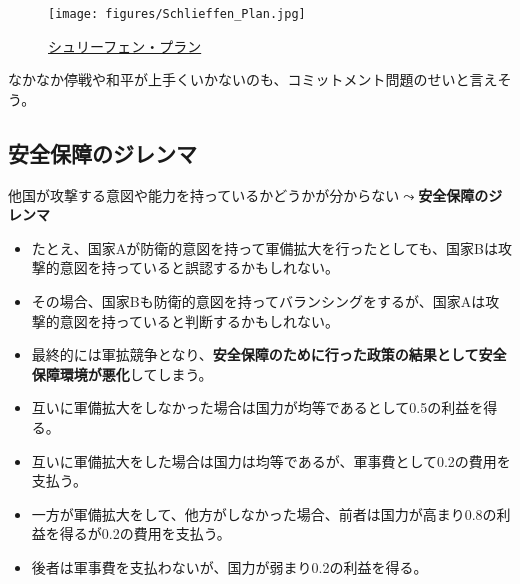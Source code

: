 \documentclass[
  xelatex,
  ja=standard]{bxjsarticle}
\providecommand{\tightlist}{%
  \setlength{\itemsep}{0pt}\setlength{\parskip}{0pt}}\usepackage{longtable,booktabs,array}
\begin{document}
\begin{figure}[htpb]

{\centering \texttt{[image: figures/Schlieffen\_Plan.jpg]}

}

\caption{\href{https://commons.wikimedia.org/wiki/File:Schlieffen_Plan.jpg}{シュリーフェン・プラン}}

\end{figure}

なかなか停戦や和平が上手くいかないのも、コミットメント問題のせいと言えそう。

\hypertarget{ux5b89ux5168ux4fddux969cux306eux30b8ux30ecux30f3ux30de}{%
\subsection{安全保障のジレンマ}\label{ux5b89ux5168ux4fddux969cux306eux30b8ux30ecux30f3ux30de}}

他国が攻撃する意図や能力を持っているかどうかが分からない\(\leadsto\)\textbf{安全保障のジレンマ}\citep{jervis1978}

\begin{itemize}
\tightlist
\item
  たとえ、国家Aが防衛的意図を持って軍備拡大を行ったとしても、国家Bは攻撃的意図を持っていると誤認するかもしれない。
\item
  その場合、国家Bも防衛的意図を持ってバランシングをするが、国家Aは攻撃的意図を持っていると判断するかもしれない。
\item
  最終的には軍拡競争となり、\textbf{安全保障のために行った政策の結果として安全保障環境が悪化}してしまう。
\end{itemize}

\begin{tcolorbox}[enhanced jigsaw, left=2mm, coltitle=black, bottomtitle=1mm, colback=white, titlerule=0mm, breakable, leftrule=.75mm, opacitybacktitle=0.6, rightrule=.15mm, colbacktitle=quarto-callout-tip-color!10!white, arc=.35mm, colframe=quarto-callout-tip-color-frame, title=\textcolor{quarto-callout-tip-color}{\faLightbulb}\hspace{0.5em}{安全保障のジレンマ（シナリオ1）}, toptitle=1mm, toprule=.15mm, bottomrule=.15mm, opacityback=0]

\begin{itemize}
\tightlist
\item
  互いに軍備拡大をしなかった場合は国力が均等であるとして0.5の利益を得る。
\item
  互いに軍備拡大をした場合は国力は均等であるが、軍事費として0.2の費用を支払う。
\item
  一方が軍備拡大をして、他方がしなかった場合、前者は国力が高まり0.8の利益を得るが0.2の費用を支払う。
\item
  後者は軍事費を支払わないが、国力が弱まり0.2の利益を得る。
\end{itemize}

\end{tcolorbox}
\end{document}
